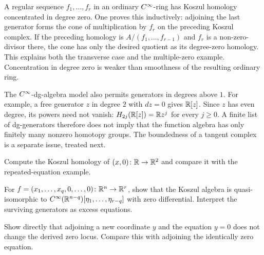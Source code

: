 A regular sequence $f_1,\ldots,f_r$ in an ordinary
$C^\infty$-ring has Koszul homology concentrated in degree zero. One proves
this inductively: adjoining the last generator forms the cone of
multiplication by $f_r$ on the preceding Koszul complex. If the preceding
homology is $A/(f_1,\ldots,f_{r-1})$ and $f_r$ is a non-zero-divisor
there, the cone has only the desired quotient as its degree-zero
homology. This explains both the transverse case and the multiple-zero
example. Concentration in degree zero is weaker than smoothness of the
resulting ordinary ring.

The $C^\infty$-dg-algebra model also permits generators in degrees above $1$.
For example, a free generator $z$ in degree $2$ with $dz=0$ gives
$\mathbb{R}[z]$. Since $z$ has even degree, its powers need not vanish:
$H_{2j}(\mathbb{R}[z])=\mathbb{R} z^j$ for every $j\geq0$.
A finite list of dg-generators therefore does not imply that the
function algebra has only finitely many nonzero homotopy groups.
The boundedness of a tangent complex is a separate issue, treated next.

\begin{exercise}
Compute the Koszul homology of $(x,0)\colon\mathbb{R}\to\mathbb{R}^2$ and compare it
with the repeated-equation example.
\end{exercise}

\begin{exercise}
For $f=(x_1,\ldots,x_q,0,\ldots,0)\colon\mathbb{R}^n\to\mathbb{R}^r$, show that the
Koszul algebra is quasi-isomorphic to
$C^\infty(\mathbb{R}^{n-q})[\eta_1,\ldots,\eta_{r-q}]$ with zero differential.
Interpret the surviving generators as excess equations.
\end{exercise}

\begin{exercise}
Show directly that adjoining a new coordinate $y$ and the equation $y=0$
does not change the derived zero locus. Compare this with adjoining the
identically zero equation.
\end{exercise}
